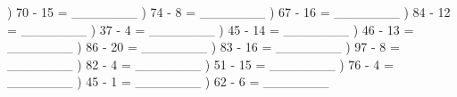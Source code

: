 \documentclass{article}%
\begin{document}
) 70 {-} 15 = \_\_\_\_\_\_\_%
\newline%
\newline%
) 74 {-} 8 = \_\_\_\_\_\_\_%
\newline%
\newline%
) 67 {-} 16 = \_\_\_\_\_\_\_%
\newline%
\newline%
) 84 {-} 12 = \_\_\_\_\_\_\_%
\newline%
\newline%
) 37 {-} 4 = \_\_\_\_\_\_\_%
\newline%
\newline%
) 45 {-} 14 = \_\_\_\_\_\_\_%
\newline%
\newline%
) 46 {-} 13 = \_\_\_\_\_\_\_%
\newline%
\newline%
) 86 {-} 20 = \_\_\_\_\_\_\_%
\newline%
\newline%
) 83 {-} 16 = \_\_\_\_\_\_\_%
\newline%
\newline%
) 97 {-} 8 = \_\_\_\_\_\_\_%
\newline%
\newline%
) 82 {-} 4 = \_\_\_\_\_\_\_%
\newline%
\newline%
) 51 {-} 15 = \_\_\_\_\_\_\_%
\newline%
\newline%
) 76 {-} 4 = \_\_\_\_\_\_\_%
\newline%
\newline%
) 45 {-} 1 = \_\_\_\_\_\_\_%
\newline%
\newline%
) 62 {-} 6 = \_\_\_\_\_\_\_%
\end{document}
